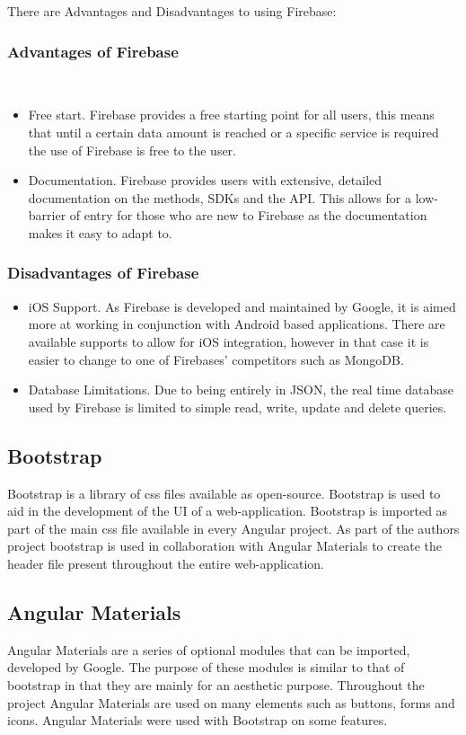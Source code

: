 There are Advantages and Disadvantages to using Firebase\cite{advdis3}: \\

\subsubsection{Advantages of Firebase}\\
\begin{itemize}
    \item Free start. Firebase provides a free starting point for all users, this means that until a certain data amount is reached or a specific service is required the use of Firebase is free to the user. 
    \item Documentation. Firebase provides users with extensive, detailed documentation on the methods, SDKs and the API. This allows for a low-barrier of entry for those who are new to Firebase as the documentation makes it easy to adapt to.
\end{itemize}

\subsubsection{Disadvantages of Firebase}
\begin{itemize}
    \item iOS Support. As Firebase is developed and maintained by Google, it is aimed more at working in conjunction with Android based applications. There are available supports to allow for iOS integration, however in that case it is easier to change to one of Firebases' competitors such as MongoDB.
    \item Database Limitations. Due to being entirely in JSON, the real time database used by Firebase is limited to simple read, write, update and delete queries. 
\end{itemize}

\subsection{Bootstrap}
Bootstrap is a library of css files available as open-source. Bootstrap is used to aid in the development of the UI of a web-application. Bootstrap is imported as part of the main css file available in every Angular project. As part of the authors project bootstrap is used in collaboration with Angular Materials to create the header file present throughout the entire web-application.

\subsection{Angular Materials}
Angular Materials are a series of optional modules that can be imported, developed by Google. The purpose of these modules is similar to that of bootstrap in that they are mainly for an aesthetic purpose. Throughout the project Angular Materials are used on many elements such as buttons, forms and icons. Angular Materials were used with Bootstrap on some features. 

